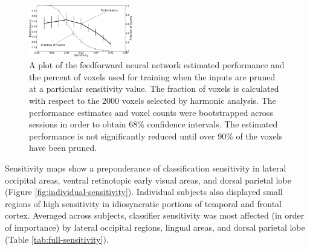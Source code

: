 \documentclass[review,1p,authoryear]{elsarticle}
\begin{document}
\begin{figure}
\centering
\includegraphics[width=0.4\textwidth]{figures/performance-verse-sensitivity-cutoff}
\caption{A plot of the feedforward neural network estimated performance and the percent of voxels used for training when the inputs are pruned at a particular sensitivity value.
The fraction of voxels is calculated with respect to the 2000 voxels selected by harmonic analysis.
The performance estimates and voxel counts were bootstrapped across sessions in order to obtain 68\% confidence intervals.
The estimated performance is not significantly reduced until over 90\% of the voxels have been pruned.}
\label{fig:sensitivity-cutoff}
\end{figure}

Sensitivity maps show a preponderance of classification sensitivity in
lateral occipital areas, ventral retinotopic early visual areas, and dorsal parietal lobe (Figure \ref{fig:individual-sensitivity}). 
Individual subjects also displayed small regions of high sensitivity in idiosyncratic portions of temporal and frontal cortex. 
Averaged across subjects, classifier sensitivity was most affected (in order of importance) by lateral occipital regions, lingual areas, and dorsal parietal lobe (Table \ref{tab:full-sensitivity}). 
\end{document}

